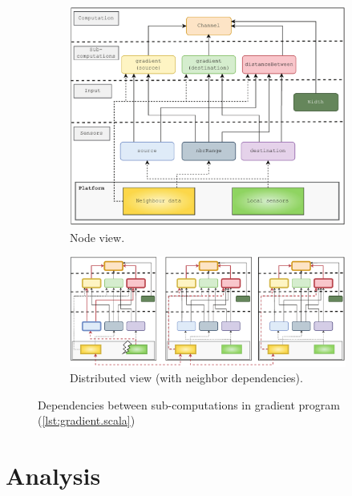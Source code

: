 \documentclass[12pt,a4paper,openright,twoside]{book}
\begin{document}
\begin{figure}
    \centering
    \begin{subfigure}[b]{\textwidth}
        \centering
        \includegraphics[width=\textwidth]{figures/gradient-dependencies.png}
        \caption{Node view.}
        \label{fig:gradient-dependencies}
    \end{subfigure}
    \hfill
    \begin{subfigure}[b]{\textwidth}
        \centering
        \includegraphics[width=\textwidth]{figures/gradient-dependencies-distributed.png}
        \caption{Distributed view (with neighbor dependencies).}
        \label{fig:gradient-dependencies-distributed}
    \end{subfigure}
    \caption{Dependencies between sub-computations in gradient program (\cref{lst:gradient.scala})}
\end{figure}

\chapter{Analysis}
\label{chap:analysis}
\end{document}
